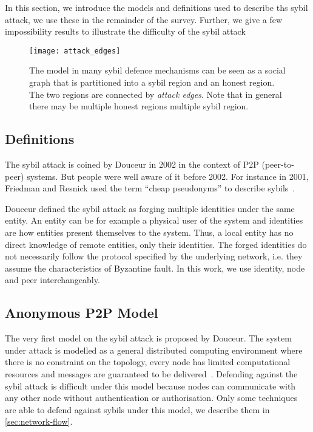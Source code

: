 In this section, we introduce the models and definitions used to describe ths
sybil attack, we use these in the remainder of the survey. Further, we give a
few impossibility results to illustrate the difficulty of the sybil attack

\begin{figure}
  \centering
  \texttt{[image: attack\_edges]}
  \caption{The model in many sybil defence mechanisms can be seen as a social
    graph that is partitioned into a sybil region and an honest region. The two
    regions are connected by \emph{attack edges}. Note that in general there may
    be multiple honest regions multiple sybil region. }
  \label{fig:attack-edge}
\end{figure}

\subsection{Definitions}
The sybil attack is coined by Douceur\cite{douceur2002sybil} in 2002 in the
context of P2P (peer-to-peer) systems. But people were well aware of it before
2002. For instance in 2001, Friedman and Resnick used the term ``cheap
pseudonyms'' to describe sybils~\cite{resnick2001social}. 

Douceur defined the sybil attack as forging multiple identities under the same
entity\cite{douceur2002sybil}. An entity can be for example a physical user of
the system and identities are how entities present themselves to the system.
Thus, a local entity has no direct knowledge of remote entities, only their
identities. The forged identities do not necessarily follow the protocol
specified by the underlying network, i.e. they assume the characteristics of
Byzantine fault\cite{lamport1982byzantine}. In this work, we use identity, node
and peer interchangeably.

\subsection{Anonymous P2P Model}
The very first model on the sybil attack is proposed by Douceur. The system
under attack is modelled as a general distributed computing environment where
there is no constraint on the topology, every node has limited computational
resources and messages are guaranteed to be delivered~\cite{douceur2002sybil}.
Defending against the sybil attack is difficult under this model because nodes
can communicate with any other node without authentication or authorisation.
Only some techniques are able to defend against sybils under this model, we
describe them in \autoref{sec:network-flow}.

